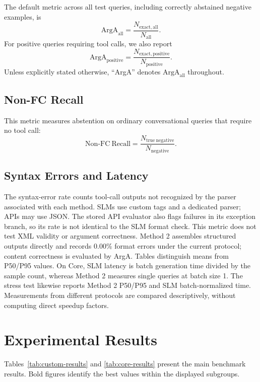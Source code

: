 \documentclass[10pt,twocolumn,a4paper]{article}
\begin{document}
The default metric across all test queries, including correctly abstained negative examples, is
\[\mathrm{ArgA}_{\mathrm{all}}=\frac{N_{\mathrm{exact,all}}}{N_{\mathrm{all}}}.\]
For positive queries requiring tool calls, we also report
\[\mathrm{ArgA}_{\mathrm{positive}}=\frac{N_{\mathrm{exact,positive}}}{N_{\mathrm{positive}}}.\]
Unless explicitly stated otherwise, ``ArgA'' denotes $\mathrm{ArgA}_{\mathrm{all}}$ throughout.

\subsection{Non-FC Recall}
This metric measures abstention on ordinary conversational queries that require no tool call:
\[\mathrm{Non\text{-}FC\ Recall}=\frac{N_{\mathrm{true\ negative}}}{N_{\mathrm{negative}}}.\]

\subsection{Syntax Errors and Latency}
The syntax-error rate counts tool-call outputs not recognized by the parser associated with each method. SLMs use custom tags and a dedicated parser; APIs may use JSON. The stored API evaluator also flags failures in its exception branch, so its rate is not identical to the SLM format check. This metric does not test XML validity or argument correctness. Method 2 assembles structured outputs directly and records 0.00\% format errors under the current protocol; content correctness is evaluated by ArgA. Tables distinguish means from P50/P95 values. On Core, SLM latency is batch generation time divided by the sample count, whereas Method 2 measures single queries at batch size 1. The stress test likewise reports Method 2 P50/P95 and SLM batch-normalized time. Measurements from different protocols are compared descriptively, without computing direct speedup factors.

\section{Experimental Results}
Tables~\ref{tab:custom-results} and \ref{tab:core-results} present the main benchmark results. Bold figures identify the best values within the displayed subgroups.
\end{document}
